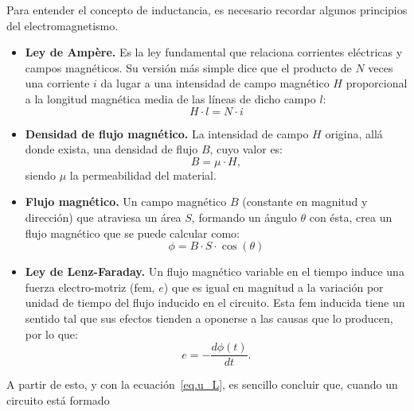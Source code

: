 	\begin{remark}
          Para entender el concepto de inductancia, es necesario
          recordar algunos principios del electromagnetismo.
          \begin{itemize}
          \item \textbf{Ley de Ampère.} Es la ley fundamental que
            relaciona corrientes eléctricas y campos magnéticos. Su
            versión más simple dice que el producto de $N$ veces una
            corriente $i$ da lugar a una intensidad de campo magnético
            $H$ proporcional a la longitud magnética media de las
            líneas de dicho campo $l$:
            \begin{equation*}
              \label{eq.ampere_mod}
              H\cdot l=N\cdot i
            \end{equation*}
          \item \textbf{Densidad de flujo magnético.} La intensidad de
            campo $H$ origina, allá donde exista, una densidad de
            flujo $B$, cuyo valor es:
            \begin{equation*}\label{eq.B}
              B=\mu\cdot H,
            \end{equation*}
            siendo $\mu$ la permeabilidad del material.
          \item \textbf{Flujo magnético.} Un campo magnético $B$
            (constante en magnitud y dirección) que atraviesa un área
            $S$, formando un ángulo $\theta$ con ésta, crea un flujo
            magnético que se puede calcular como:
            \begin{equation*}\label{eq.flujo1}
              \phi=B\cdot S\cdot \cos (\theta)
            \end{equation*}
          \item \textbf{Ley de Lenz-Faraday.} Un flujo magnético
            variable en el tiempo induce una fuerza electro-motriz
            (fem, $e$) que es igual en magnitud a la variación por
            unidad de tiempo del flujo inducido en el circuito. Esta
            fem inducida tiene un sentido tal que sus efectos tienden
            a oponerse a las causas que lo producen, por lo que:
            \begin{equation*}\label{eq.lenz-faraday}
              e=-\dfrac{d\phi(t)}{dt}.
            \end{equation*}
          \end{itemize}
          A partir de esto, y con la ecuación~\eqref{eq.u_L}, es
          sencillo concluir que, cuando un circuito está formado

\end{remark}

